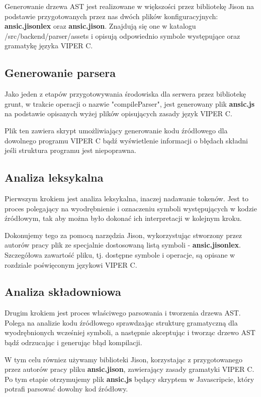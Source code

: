 \documentclass[a4paper,twoside,openright,11pt]{report}
\begin{document}
\par Generowanie drzewa AST jest realizowane w większości przez bibliotekę Jison na podstawie przygotowanych przez nas dwóch plików konfiguracyjnych: \textbf{ansic.jisonlex} oraz \textbf{ansic.jison}. Znajdują się one w katalogu /src/backend/parser/assets i opisują odpowiednio symbole występujące oraz gramatykę języka VIPER C.

  \subsection {Generowanie parsera}
\par Jako jeden z etapów przygotowywania środowiska dla serwera przez bibliotekę grunt, w trakcie operacji o nazwie "compileParser", jest generowany plik \textbf{ansic.js} na podstawie opisanych wyżej plików opisujących zasady język VIPER C. 
\par Plik ten zawiera skrypt umożliwiający generowanie kodu źródłowego dla dowolnego programu VIPER C bądź wyświetlenie informacji o błędach składni jeśli struktura programu jest niepoprawna. 

  \subsection {Analiza leksykalna}
\par Pierwszym krokiem jest analiza leksykalna, inaczej nadawanie tokenów. Jest to proces polegający na wyodrębnienie i oznaczeniu symboli występujących w kodzie źródłowym, tak aby można było dokonać ich interpretacji w kolejnym kroku. 
\par Dokonujemy tego za pomocą narzędzia Jison, wykorzystując stworzony przez autorów pracy plik ze specjalnie dostosowaną listą symboli - \textbf{ansic.jisonlex}. Szczegółowa zawartość pliku, tj. dostępne symbole i operacje, są opisane w rozdziale poświęconym językowi VIPER C.

  \subsection {Analiza składowniowa}
\par Drugim krokiem jest proces właściwego parsowania i tworzenia drzewa AST. Polega na analizie kodu źródłowego sprawdzając strukturę gramatyczną dla wyodrębnionych wcześniej symboli, a następnie akceptując i tworząc drzewo AST bądź odrzucając i generując błąd kompilacji. \cite{ansk} 
\par W tym celu równiez używamy biblioteki Jison, korzystając z przygotowanego przez autorów pracy pliku \textbf{ansic.jison}, zawierający zasady gramatyki VIPER C. Po tym etapie otrzymujemy plik \textbf{ansic.js} będący skryptem w Javascripcie, który potrafi parsować dowolny kod źródłowy.
\end{document}
